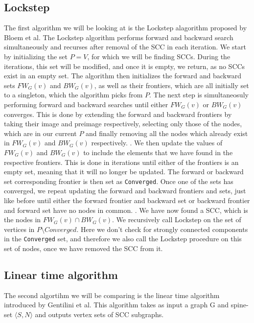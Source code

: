 \documentclass[../master.tex]{subfiles}
\newcommand{\FW}[2][G]{\ensuremath{FW_{#1}(#2)}}
\newcommand{\BW}[2][G]{\ensuremath{BW_{#1}(#2)}}
\begin{document}
\subsection{Lockstep}
The first algorithm we will be looking at is the Lockstep alagorithm proposed by Bloem et al. \cite{lockstep} The Lockstep algorithm performs forward and backward search simultaneously and recurses after removal of the SCC in each iteration.
We start by initializing the set $P=V$, for which we will be finding SCCs. During the iterations, this set will be modified, and once it is empty, we return, as no SCCs exist in an empty set. The algorithm then initializes the forward and backward sets \FW{v} and \BW{v}, as well as their frontiers, which are all initially set to a singleton, which the algorithm picks from $P$.
The next step is simultaneosuly performing forward and backward searches until either \FW{v} or \BW{v} converges. This is done by extending the forward and backward frontiers by  taking their image and preimage respectively, selecting only those of the nodes, which are in our current $P$ and finally removing all the nodes which already exist in \FW{v} and \BW{v} respectively. . We then update the values of \FW{v} and \BW{v} to include the elements that we have found in the respective frontiers. This is done in iterations until either of the frontiers is an empty set, meaning that it will no longer be updated. The forward or backward set corresponding frontier is then set as \texttt{Converged}.
Once one of the sets has converged, we repeat updating the forward and backward frontiers and sets, just like before until either the forward frontier and backward set or backward frontier and forward set have no nodes in common. .
We have now found a SCC, which is the nodes in $\FW{v}\cap\BW{v}$.
We recursively call Lockstep on the set of vertices in $P\setminus Converged$. Here we don't check for strongly connected components in the \texttt{Converged} set, and therefore we also call the Lockstep procedure on this set of nodes, once we have removed the SCC from it.

\subsection{Linear time algorithm}
The second algortihm we will be comparing is the linear time algorithm \cite{linear} introduced by Gentilini et al. This algorithm takes as input a graph G and spine-set $\langle S, N\rangle$ and outputs vertex sets of SCC subgraphs.
\end{document}
